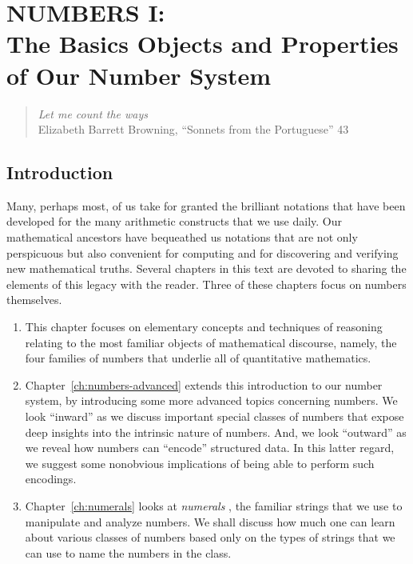 
\chapter{NUMBERS I: \\
The Basics Objects and Properties of Our Number System}
\label{ch:numbers-numerals}

\begin{quote}
{\em Let me count the ways} \\
\hspace*{1in}Elizabeth Barrett Browning, ``Sonnets from
the Portuguese'' 43
\end{quote}

\section{Introduction}

Many, perhaps most, of us take for granted the brilliant notations
that have been developed for the many arithmetic constructs that we
use daily.  Our mathematical ancestors have bequeathed us notations
that are not only perspicuous but also convenient for computing and
for discovering and verifying new mathematical truths.  Several
chapters in this text are devoted to sharing the elements of this
legacy with the reader.  Three of these chapters focus on numbers
themselves.
\begin{enumerate}
\item
This chapter focuses on elementary concepts and techniques of
reasoning relating to the most familiar objects of mathematical
discourse, namely, the four families of numbers that underlie all of
quantitative mathematics.
\item
Chapter~\ref{ch:numbers-advanced} extends this introduction to our
number system, by introducing some more advanced topics concerning
numbers.  We look ``inward'' as we discuss important special classes
of numbers that expose deep insights into the intrinsic nature of
numbers.  And, we look ``outward'' as we reveal how numbers can
``encode'' structured data.  In this latter regard, we suggest some
nonobvious implications of being able to perform such encodings.
\item
Chapter~\ref{ch:numerals} looks at {\it numerals} ,
the familiar strings that we use to manipulate and analyze numbers.
  We shall discuss how much one can learn
about various classes of numbers based only on the types of strings
that we can use to name the numbers in the class.
\end{enumerate}

